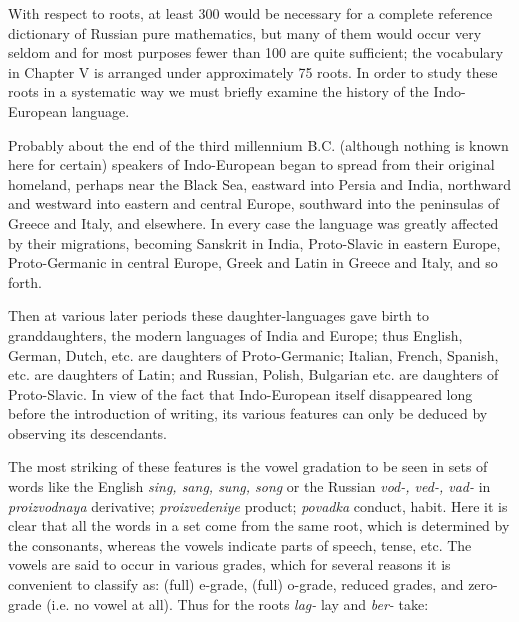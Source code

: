 With respect to roots, at least 300 would be necessary for a complete reference dictionary of Russian pure mathematics, but many of them would occur very seldom and for most purposes fewer than 100 are quite sufficient; the vocabulary in Chapter V is arranged under approximately 75 roots. In order to study these roots in a systematic way we must briefly examine the history of the Indo-European language.


Probably about the end of the third millennium B.C. (although nothing is known here for certain) speakers of Indo-European began to spread from their original homeland, perhaps near the Black Sea, eastward into Persia and India, northward and westward into eastern and central Europe, southward into the peninsulas of Greece and Italy, and elsewhere. In every case the language was greatly affected by their migrations, becoming Sanskrit in India, Proto-Slavic in eastern Europe, Proto-Germanic in central Europe, Greek and Latin in Greece and Italy, and so forth.

Then at various later periods these daughter-languages gave birth to granddaughters, the modern languages of India and Europe; thus English, German, Dutch, etc. are daughters of Proto-Germanic; Italian, French, Spanish, etc. are daughters of Latin; and Russian, Polish, Bulgarian etc. are daughters of Proto-Slavic. In view of the fact that Indo-European itself disappeared long before the introduction of writing, its various features can only be deduced by observing its descendants.


The most striking of these features is the vowel gradation to be seen in sets of words like the English \emph{sing, sang, sung, song} or the Russian \emph{vod-, ved-, vad-} in \emph{proizvodnaya} derivative; \emph{proizvedeniye} product; \emph{povadka} conduct, habit. Here it is clear that all the words in a set come from the same root, which is determined by the consonants, whereas the vowels indicate parts of speech, tense, etc. The vowels are said to occur in various grades, which for several reasons it is convenient to classify as: (full) e-grade, (full) o-grade, reduced grades, and zero-grade (i.e. no vowel at all). Thus for the roots \emph{lag-} lay and \emph{ber-} take:

